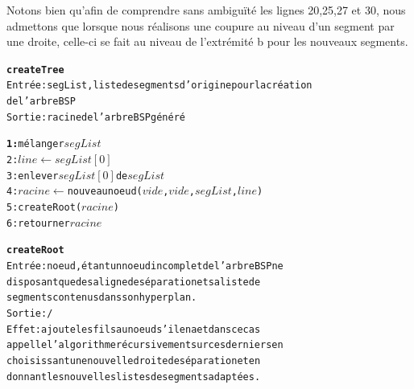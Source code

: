 \documentclass[11pt,a4paper]{article}
\theoremstyle{definition}
\theoremstyle{remark}
\begin{document}
Notons bien qu'afin de comprendre sans ambiguïté les lignes 20,25,27 et 30, nous admettons que lorsque nous réalisons une coupure au niveau d'un segment par une droite, celle-ci se fait au niveau de l'extrémité b pour les nouveaux segments. 

\begin{alltt}
\textbf{createTree}
Entrée : segList, liste de segments d'origine pour la création 
de l'arbre BSP
Sortie : racine de l'arbre BSP généré

\textbf{1:} mélanger \(segList\)
2: \(line \leftarrow segList[0]\)
3: enlever \(segList[0]\) de \(segList\)
4: \(racine\) \(\leftarrow\) nouveau noeud (\(vide\), \(vide\), \(segList\), \(line\))
5: createRoot(\(racine\))
6: retourner \(racine\)
\end{alltt} 

\begin{alltt}
\textbf{createRoot}
Entrée : noeud, étant un noeud incomplet de l'arbre BSP ne
disposant que de sa ligne de séparation et sa liste de
segments contenus dans son hyperplan.
Sortie : /
Effet : ajoute les fils au noeud s'il en a et dans ce cas 
appelle l'algorithme récursivement sur ces derniers en 
choisissant une nouvelle droite de séparation et en 
donnant les nouvelles listes de segments adaptées.


\end{alltt}
\end{document}
